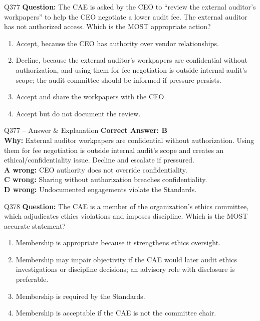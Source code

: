 \documentclass[aspectratio=169,10pt]{beamer}
\begin{document}
	\begin{frame}[t]{Q377}
		\small
		\textbf{Question:} The CAE is asked by the CEO to ``review the external auditor's workpapers'' to help the CEO negotiate a lower audit fee. The external auditor has not authorized access. Which is the MOST appropriate action?
		\begin{enumerate}[label=\Alph*.,itemsep=1pt,topsep=2pt]
			\item Accept, because the CEO has authority over vendor relationships.
			\item Decline, because the external auditor's workpapers are confidential without authorization, and using them for fee negotiation is outside internal audit's scope; the audit committee should be informed if pressure persists.
			\item Accept and share the workpapers with the CEO.
			\item Accept but do not document the review.
		\end{enumerate}
	\end{frame}
	
	\begin{frame}[t]{Q377 -- Answer \& Explanation}
		\small
		\textbf{Correct Answer: B} \\[4pt]
		\textbf{Why:} External auditor workpapers are confidential without authorization. Using them for fee negotiation is outside internal audit's scope and creates an ethical/confidentiality issue. Decline and escalate if pressured. \\[4pt]
		\textbf{A wrong:} CEO authority does not override confidentiality. \\[2pt]
		\textbf{C wrong:} Sharing without authorization breaches confidentiality. \\[2pt]
		\textbf{D wrong:} Undocumented engagements violate the Standards.
	\end{frame}
	
	\begin{frame}[t]{Q378}
		\small
		\textbf{Question:} The CAE is a member of the organization's ethics committee, which adjudicates ethics violations and imposes discipline. Which is the MOST accurate statement?
		\begin{enumerate}[label=\Alph*.,itemsep=1pt,topsep=2pt]
			\item Membership is appropriate because it strengthens ethics oversight.
			\item Membership may impair objectivity if the CAE would later audit ethics investigations or discipline decisions; an advisory role with disclosure is preferable.
			\item Membership is required by the Standards.
			\item Membership is acceptable if the CAE is not the committee chair.
		\end{enumerate}
	\end{frame}
	
\end{document}
